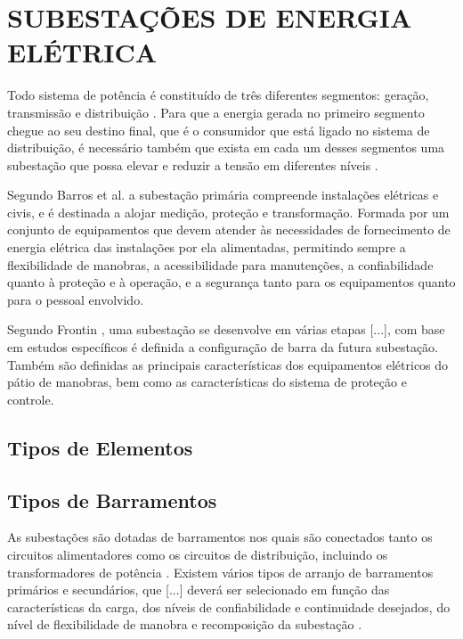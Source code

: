 \chapter{SUBESTAÇÕES DE ENERGIA ELÉTRICA}

Todo sistema de potência é constituído de três diferentes segmentos: geração, transmissão e distribuição \cite{mamede2011subestacoes}. Para que a energia gerada no primeiro segmento chegue ao seu destino final, que é o consumidor que está ligado no sistema de distribuição, é necessário também que exista em cada um desses segmentos uma subestação que possa elevar e reduzir a tensão em diferentes níveis \cite{mamede2011subestacoes}.

Segundo Barros et al. \citeyearpar{barros2009cabine} a subestação primária compreende instalações elétricas e civis, e é destinada a alojar medição, proteção e transformação. Formada por um conjunto de equipamentos que devem atender às necessidades de fornecimento de energia elétrica das instalações por ela alimentadas, permitindo sempre a flexibilidade de manobras, a acessibilidade para manutenções, a confiabilidade quanto à proteção e à operação, e a segurança tanto para os equipamentos quanto para o pessoal envolvido.

Segundo Frontin \citeyearpar{frontin2013equipamentos}, uma subestação se desenvolve em várias etapas [...], com base em estudos específicos é definida a configuração de barra da futura subestação. Também são definidas as principais características dos equipamentos elétricos do pátio de manobras, bem como as características do sistema de proteção e controle. 


\section{Tipos de Elementos}


\section{Tipos de Barramentos}

As subestações são dotadas de barramentos nos quais são conectados tanto os circuitos alimentadores como os circuitos de distribuição, incluindo os transformadores de potência \cite{mamede2000protecao}. Existem vários tipos de arranjo de barramentos primários e secundários, que [...] deverá ser selecionado em função das características da carga, dos níveis de confiabilidade e continuidade desejados, do nível de flexibilidade de manobra e recomposição da subestação \cite{mamede2000protecao}.

